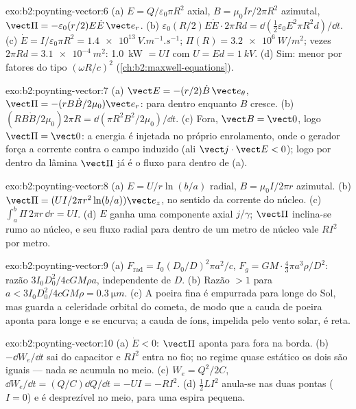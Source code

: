 \begin{solution}{exo:b2:poynting-vector:6}
(a) $E = Q/\varepsilon_0\pi R^2$ axial, $B = \mu_0Ir/2\pi R^2$ azimutal, $\vect\Pi = -\varepsilon_0
(r/2)E\dot E\,\vect e_r$. (b) $\varepsilon_0(R/2)E\dot E\cdot2\pi Rd = \dd(\tfrac12\varepsilon_0E^2\pi R^2d)/
\dd t$. (c) $\dot E = I/\varepsilon_0\pi R^2 = \qty{1.4e13}{V.m^{-1}.s^{-1}}$; $\Pi(R) = \qty{3.2e6}{W/m^2}$;
vezes $2\pi Rd = \qty{3.1e-4}{m^2}$: \qty{1.0}{kW} $= UI$ com $U = Ed = \qty{1}{kV}$. (d)
Sim: menor por fatores do tipo $(\omega R/c)^2$ (\cref{ch:b2:maxwell-equations}).
\end{solution}

\begin{solution}{exo:b2:poynting-vector:7}
(a) $\vect E = -(r/2)\dot B\,\vect e_\theta$, $\vect\Pi = -(rB\dot B/2\mu_0)\vect e_r$: para dentro
enquanto $B$ cresce. (b) $(RB\dot B/2\mu_0)2\pi R = \dd(\pi R^2B^2/2\mu_0)/\dd t$. (c)
Fora, $\vect B = \vect 0$, logo $\vect\Pi = \vect 0$: a energia é injetada no
próprio enrolamento, onde o gerador força a corrente contra o
campo induzido (ali $\vect j\cdot\vect E < 0$); logo por dentro da lâmina
$\vect\Pi$ já é o fluxo para dentro de (a).
\end{solution}

\begin{solution}{exo:b2:poynting-vector:8}
(a) $E = U/r\ln(b/a)$ radial, $B = \mu_0I/2\pi r$ azimutal. (b) $\vect\Pi = (UI/
2\pi r^2\ln(b/a))\vect e_z$, no sentido da corrente do núcleo. (c) $\int_a^b\Pi\,2\pi r\,\dd r =
UI$. (d) $E$ ganha uma componente axial $j/\gamma$; $\vect\Pi$ inclina-se rumo ao
núcleo, e seu fluxo radial para dentro de um metro de núcleo vale $RI^2$ por metro.
\end{solution}

\begin{solution}{exo:b2:poynting-vector:9}
(a) $F_{\text{rad}} = I_0(D_0/D)^2\pi a^2/c$, $F_g = GM\cdot\tfrac43\pi a^3\rho/D^2$: razão
$3I_0D_0^2/4cGM\rho a$, independente de $D$. (b) Razão $> 1$ para $a < 3I_0D_0^2/
4cGM\rho = \qty{0.3}{\micro m}$. (c) A poeira fina é empurrada para longe do Sol, mas
guarda a celeridade orbital do cometa, de modo que a cauda de poeira aponta para longe e
se encurva; a cauda de íons, impelida pelo vento solar, é reta.
\end{solution}

\begin{solution}{exo:b2:poynting-vector:10}
(a) $\dot E < 0$: $\vect\Pi$ aponta para fora na borda. (b) $-\dd W_e/\dd t$
sai do capacitor e $RI^2$ entra no fio; no regime quase estático
os dois são iguais --- nada se acumula no meio. (c) $W_e =
Q^2/2C$, $\dd W_e/\dd t = (Q/C)\dd Q/\dd t = -UI = -RI^2$. (d) $\tfrac12LI^2$
anula-se nas duas pontas ($I = 0$) e é desprezível no meio, para uma espira
pequena.
\end{solution}

